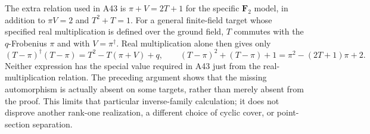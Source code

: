 The extra relation used in A43 is
$\pi+V=2T+1$ for the specific $\mathbf F_2$ model, in addition
to $\pi V=2$ and $T^2+T=1$.  For a general finite-field
target whose specified real multiplication is defined over the
ground field, $T$ commutes with the $q$-Frobenius $\pi$ and
with $V=\pi^\dagger$.  Real multiplication alone then gives only
\[
 (T-\pi)^\dagger(T-\pi)=T^2-T(\pi+V)+q,
 \qquad
 (T-\pi)^2+(T-\pi)+1
                =\pi^2-(2T+1)\pi+2.
\]
Neither expression has the special value required in A43 just
from the real-multiplication relation.  The preceding argument
shows that the missing automorphism is actually absent on some
targets, rather than merely absent from the proof.
This limits that particular inverse-family calculation; it
does not disprove another rank-one realization, a different
choice of cyclic cover, or point-section separation.
